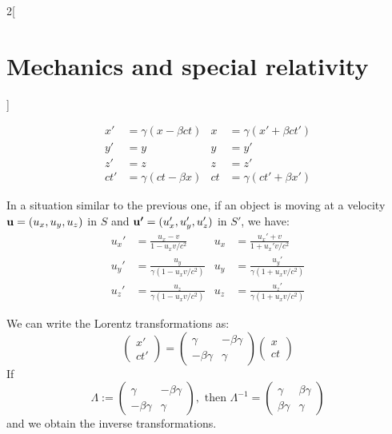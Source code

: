 \documentclass[../../../main.tex]{subfiles}
\begin{document}
\begin{multicols}{2}[\section{Mechanics and special relativity}]
\begin{proposition}
\begin{align*}
      x'  & =\gamma(x-\beta ct) & x  & =\gamma(x'+\beta ct') \\
      y'  & =y                  & y  & =y'                   \\
      z'  & =z                  & z  & =z'                   \\
      ct' & =\gamma(ct-\beta x) & ct & =\gamma(ct'+\beta x')
    \end{align*}
  \end{proposition}
  \begin{proposition}
    In a situation similar to the previous one, if an object is moving at a velocity $\boldsymbol{\mathrm{u}}=(u_x,u_y,u_z)$ in $S$ and $\boldsymbol{\mathrm{u'}}=(u_x',u_y',u_z')$ in $S'$, we have:
    \begin{align*}
      u_x' & =\frac{u_x-v}{1-u_xv/c^2}                   & u_x & =\frac{u_x'+v}{1+u_x'v/c^2}                  \\
      u_y' & =\frac{u_y}{\gamma \left(1-u_xv/c^2\right)} & u_y & =\frac{u_y'}{\gamma \left(1+u_xv/c^2\right)} \\
      u_z' & =\frac{u_z}{\gamma \left(1-u_xv/c^2\right)} & u_z & =\frac{u_z'}{\gamma \left(1+u_xv/c^2\right)}
    \end{align*}
  \end{proposition}
  \begin{proposition}
    We can write the Lorentz transformations as:
    $$\begin{pmatrix}
        x' \\
        ct'
      \end{pmatrix}=\begin{pmatrix}
        \gamma       & -\beta\gamma \\
        -\beta\gamma & \gamma
      \end{pmatrix}\begin{pmatrix}
        x \\
        ct
      \end{pmatrix}$$ If $$\Lambda:=\begin{pmatrix}
        \gamma       & -\beta\gamma \\
        -\beta\gamma & \gamma
      \end{pmatrix},\text{ then }\Lambda^{-1}=\begin{pmatrix}
        \gamma      & \beta\gamma \\
        \beta\gamma & \gamma
      \end{pmatrix}$$ and we obtain the inverse transformations.

\end{proposition}
\end{multicols}
\end{document}
